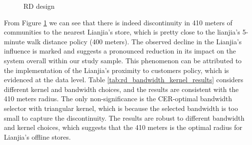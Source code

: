 \documentclass[11pt]{article}
\begin{document}
\begin{figure}[ht]
    \centering
    \hfill %
    \hfill %
    \caption{RD design}
    \label{fig:RD_design}
\end{figure}



From Figure \ref{fig:RD_design} we can see that there is indeed discontinuity in 410 meters of communities to the nearest Lianjia's store, which is pretty close to the lianjia's 5-minute walk distance policy (400 meters). The observed decline in the Lianjia's influence is marked and suggests a pronounced reduction in its impact on the system overall within our study sample. This phenomenon can be attributed to the implementation of the Lianjia's proximity to customers policy, which is evidenced at the data level. Table \ref{tab:rd_bandwidth_kernel_results} considers different kernel and bandwidth choices, and the results are consistent with the 410 meters radius. The only non-significance is the CER-optimal bandwidth selector with triangular kernel, which is because the selected bandwidth is too small to capture the discontinuity. The results are robust to different bandwidth and kernel choices, which suggests that the 410 meters is the optimal radius for Lianjia's offline stores.
\end{document}
